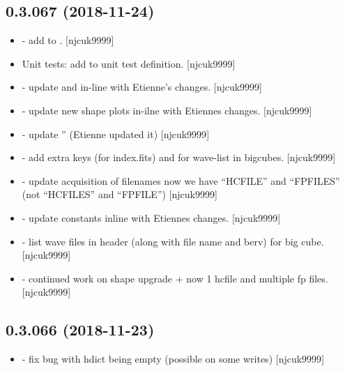 \documentclass[a4paper,10pt,english]{report}
\begin{document}
\subsection{0.3.067 (2018-11-24)}
\label{\detokenize{misc/changelog:id256}}\begin{itemize}
\item {} 
 - add  to . {[}njcuk9999{]}

\item {} 
Unit tests: add  to unit test definition. {[}njcuk9999{]}

\item {} 
 - update  and  in-line with
Etienne’s changes. {[}njcuk9999{]}

\item {} 
 - update new shape plots in-ilne with Etiennes changes.
{[}njcuk9999{]}

\item {} 
 - update ” (Etienne updated it) {[}njcuk9999{]}

\item {} 
 - add extra keys (for index.fits) and for wave-list
in bigcubes. {[}njcuk9999{]}

\item {} 
 - update acquisition of filenames now we have “HCFILE”
and “FPFILES” (not “HCFILES” and “FPFILE”) {[}njcuk9999{]}

\item {} 
 - update constants inline with Etiennes
changes. {[}njcuk9999{]}

\item {} 
 - list wave files in header (along with file
name and berv) for big cube. {[}njcuk9999{]}

\item {} 
 - continued work on shape upgrade + now 1 hcfile
and multiple fp files. {[}njcuk9999{]}

\end{itemize}


\subsection{0.3.066 (2018-11-23)}
\label{\detokenize{misc/changelog:id257}}\begin{itemize}
\item {} 
 - fix bug with hdict being empty (possible on some
writes) {[}njcuk9999{]}

\end{itemize}
\end{document}
